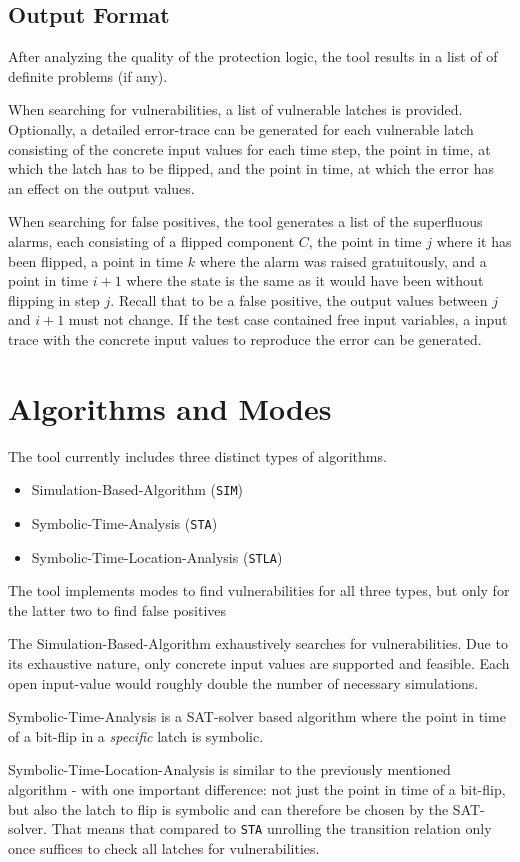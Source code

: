 \documentclass[a4paper,10pt]{article}
\begin{document}
\subsection{Output Format}
After analyzing the quality of the protection logic, the tool results in a list of of definite problems (if any).

When searching for vulnerabilities, a list of vulnerable latches is provided. Optionally, a detailed error-trace can be generated
for each vulnerable latch consisting of the concrete input values for each time step, the point in time, at which the latch has to be flipped,
and the point in time, at which the error has an effect on the output values.

When searching for false positives, the tool generates a list of the superfluous alarms, each consisting of a flipped component $C$,
the point in time $j$ where it has been flipped, a point in time $k$ where the alarm was raised gratuitously, and a point in time $i+1$ where 
the state is the same as it would have been without flipping in step $j$. Recall that to be a false positive, the output values between $j$ and $i+1$ must not change.
If the test case contained free input variables, a input trace with the concrete input values to reproduce the error can be generated.
\newpage
\section{Algorithms and Modes} \label{algorithms}
The tool currently includes three distinct types of algorithms.
\begin{itemize}
 \item Simulation-Based-Algorithm (\texttt{SIM})
 \item Symbolic-Time-Analysis (\texttt{STA})
 \item Symbolic-Time-Location-Analysis (\texttt{STLA})
\end{itemize}
The tool implements modes to find vulnerabilities for all three types, but only for the latter two to find false positives

The Simulation-Based-Algorithm exhaustively searches for vulnerabilities. Due to its exhaustive nature, only concrete input values are supported and feasible. Each open input-value would roughly double the number of
necessary simulations.

Symbolic-Time-Analysis is a SAT-solver based algorithm where the point in time of a bit-flip in a \emph{specific} latch is symbolic.

Symbolic-Time-Location-Analysis is similar to the previously mentioned algorithm - with one important difference: not just the point in time of a bit-flip, but also the latch to flip is symbolic and can therefore be chosen
by the SAT-solver. That means that compared to \texttt{STA} unrolling the transition relation only once suffices to check all latches for vulnerabilities.
\end{document}
